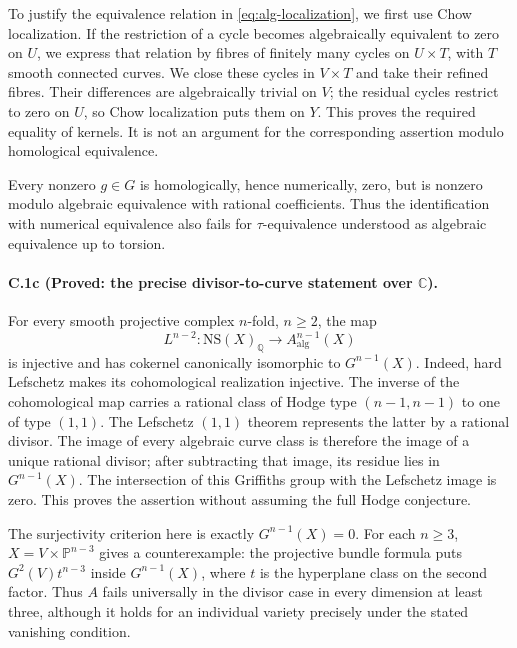To justify the equivalence relation in \eqref{eq:alg-localization}, we
first use Chow localization. If the restriction of a cycle becomes
algebraically equivalent to zero on $U$, we express that relation by
fibres of finitely many cycles on $U\times T$, with $T$ smooth connected
curves. We close these cycles in $V\times T$ and take their refined
fibres. Their differences are algebraically trivial on $V$; the residual
cycles restrict to zero on $U$, so Chow localization puts them on $Y$.
This proves the required equality of kernels. It is not an argument for
the corresponding assertion modulo homological equivalence.

Every nonzero $g\in G$ is homologically, hence numerically, zero, but is
nonzero modulo algebraic equivalence with rational coefficients.
Thus the identification with numerical equivalence also fails for
$\tau$-equivalence understood as algebraic equivalence up to torsion.

\paragraph{C.1c (Proved: the precise divisor-to-curve statement over $\mathbb C$).}
For every smooth projective complex $n$-fold, $n\ge2$, the map
\[
 L^{n-2}:\mathrm{NS}(X)_{\mathbb Q}\longrightarrow
 A^{n-1}_{\mathrm{alg}}(X)
\]
is injective and has cokernel canonically isomorphic to $G^{n-1}(X)$.
Indeed, hard Lefschetz makes its cohomological realization injective.
The inverse of the cohomological map carries a rational class of Hodge
type $(n-1,n-1)$ to one of type $(1,1)$. The Lefschetz $(1,1)$ theorem
represents the latter by a rational divisor. The image of every algebraic
curve class is therefore the image of a unique rational divisor; after
subtracting that image, its residue lies in $G^{n-1}(X)$. The intersection
of this Griffiths group with the Lefschetz image is zero. This proves
the assertion without assuming the full Hodge conjecture.

The surjectivity criterion here is exactly $G^{n-1}(X)=0$. For each
$n\ge3$, $X=V\times\mathbb P^{n-3}$ gives a counterexample: the projective
bundle formula puts $G^2(V)t^{n-3}$ inside $G^{n-1}(X)$, where $t$ is the
hyperplane class on the second factor. Thus $A$ fails universally in
the divisor case in every dimension at least three, although it holds
for an individual variety precisely under the stated vanishing condition.

